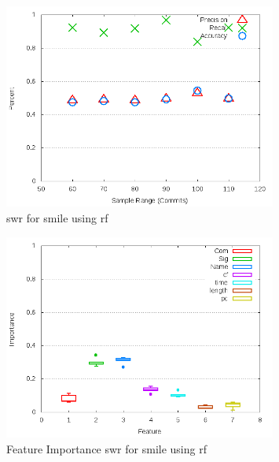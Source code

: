 \begin{figure}[!t]
\centering
\includegraphics[width=0.8\textwidth]{images/rf/test_1/smile_sample_range.png}
\caption{\gls{swr} for smile using \gls{rf}}
\label{fig:test_1_smile_rf}
\end{figure}

\begin{figure}[!t]
\centering
\includegraphics[width=0.8\textwidth]{images/rf/test_1/smile_importance.png}
\caption{Feature Importance \gls{swr} for smile using \gls{rf}}
\label{fig:test_1_smile_rf_importance}
\end{figure}

